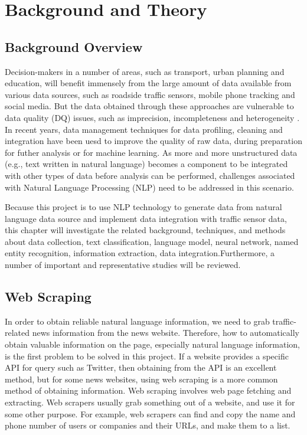 
\chapter{Background and Theory}
\label{cha:bib}
\section{Background Overview}
\qquad Decision-makers in a number of areas, such as transport, urban planning and education, will benefit immensely from the large amount of data available from various data sources, such as roadside traffic sensors, mobile phone tracking \cite{lopes2010traffic} and social media. But the data obtained through these approaches are vulnerable to data quality (DQ) issues, such as imprecision, incompleteness and heterogeneity\cite{hutchins2008probabilistic} \cite{jagadish2014big}. In recent years, data management techniques for data profiling, cleaning and integration have been uesd to improve the quality of raw data, during preparation for futher analysis or for machine learning. As more and more unstructured data (e.g., text written in natural language) becomes a component to be integrated with other types of data before analysis can be performed, challenges associated with Natural Language Processing (NLP) need to be addressed in this scenario. 

Because this project is to use NLP technology to generate data from natural language data source and implement data integration with traffic sensor data, this chapter will investigate the related background, techniques, and methods about data collection, text classification, language model, neural network, named entity recognition, information extraction, data integration.Furthermore, a number of important and representative studies will be reviewed. 
\section{Web Scraping}
\qquad In order to obtain reliable natural language information, we need to grab traffic-related news information from the news website. Therefore, how to automatically obtain valuable information on the page, especially natural language information, is the first problem to be solved in this project. If a website provides a specific API for query such as Twitter, then obtaining from the API is an excellent method, but for some news websites, using web scraping is a more common method of obtaining information. Web scraping involves web page fetching and extracting. Web scrapers usually grab something out of a website, and use it for some other purpose. For example, web scrapers can find and copy the name and phone number of users or companies and their URLs, and make them to a list.
